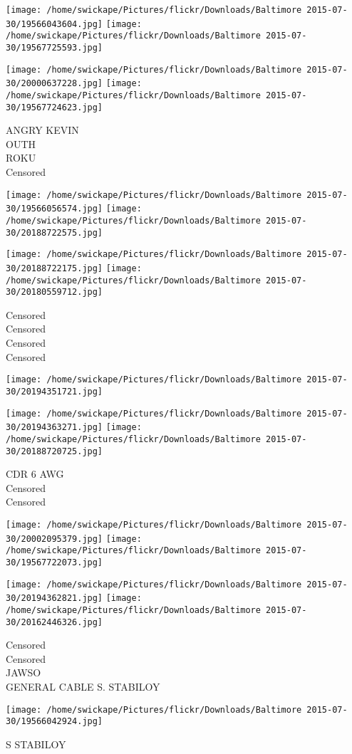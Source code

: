 \documentclass[10pt,letterpaper]{article}
\begin{document}
\texttt{[image: /home/swickape/Pictures/flickr/Downloads/Baltimore 2015-07-30/19566043604.jpg]}
\texttt{[image: /home/swickape/Pictures/flickr/Downloads/Baltimore 2015-07-30/19567725593.jpg]}

\texttt{[image: /home/swickape/Pictures/flickr/Downloads/Baltimore 2015-07-30/20000637228.jpg]}
\texttt{[image: /home/swickape/Pictures/flickr/Downloads/Baltimore 2015-07-30/19567724623.jpg]}

ANGRY KEVIN\\
OUTH\\
ROKU\\
Censored
\pagebreak

\texttt{[image: /home/swickape/Pictures/flickr/Downloads/Baltimore 2015-07-30/19566056574.jpg]}
\texttt{[image: /home/swickape/Pictures/flickr/Downloads/Baltimore 2015-07-30/20188722575.jpg]}

\texttt{[image: /home/swickape/Pictures/flickr/Downloads/Baltimore 2015-07-30/20188722175.jpg]}
\texttt{[image: /home/swickape/Pictures/flickr/Downloads/Baltimore 2015-07-30/20180559712.jpg]}

Censored\\
Censored\\
Censored\\
Censored
\pagebreak

\texttt{[image: /home/swickape/Pictures/flickr/Downloads/Baltimore 2015-07-30/20194351721.jpg]}

\vspace{0.25in}
\texttt{[image: /home/swickape/Pictures/flickr/Downloads/Baltimore 2015-07-30/20194363271.jpg]}
\texttt{[image: /home/swickape/Pictures/flickr/Downloads/Baltimore 2015-07-30/20188720725.jpg]}

CDR 6 AWG\\
Censored\\
Censored
\pagebreak

\texttt{[image: /home/swickape/Pictures/flickr/Downloads/Baltimore 2015-07-30/20002095379.jpg]}
\texttt{[image: /home/swickape/Pictures/flickr/Downloads/Baltimore 2015-07-30/19567722073.jpg]}

\texttt{[image: /home/swickape/Pictures/flickr/Downloads/Baltimore 2015-07-30/20194362821.jpg]}
\texttt{[image: /home/swickape/Pictures/flickr/Downloads/Baltimore 2015-07-30/20162446326.jpg]}

Censored\\
Censored\\
JAWSO\\
GENERAL CABLE S. STABILOY
\pagebreak

\texttt{[image: /home/swickape/Pictures/flickr/Downloads/Baltimore 2015-07-30/19566042924.jpg]}

S STABILOY
\pagebreak
\end{document}
